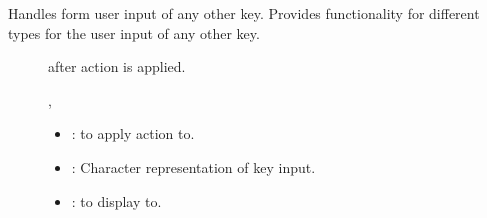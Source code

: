 \documentclass[letterpaper,10pt,english]{sphinxmanual}
\begin{document}
\begin{fulllineitems}
\begin{fulllineitems}
\label{\detokenize{index:_CPPv2N7ostendo3AddE3Vari6Window}}%
\pysigstartmultiline
{}\label{\detokenize{index:Pessumnamespaceostendo_1ac7a01c5f1ce53b6361e62f349f8f5ee4}}%
\pysigstopmultiline
Handles form user input of any other key. Provides functionality for different {\hyperref[\detokenize{index:Pessumstructostendo_1_1Var}]{}} types for the user input of any other key. \begin{description}
\item[{}] \leavevmode
{\hyperref[\detokenize{index:Pessumstructostendo_1_1Var}]{}} after action is applied. 

\item[{}] \leavevmode
{\hyperref[\detokenize{index:Pessumstructostendo_1_1Var}]{}}, {\hyperref[\detokenize{index:Pessumclassostendo_1_1Window}]{}} 

\item[{}] \leavevmode\begin{itemize}
\item {} 
: {\hyperref[\detokenize{index:Pessumstructostendo_1_1Var}]{}} to apply action to. 

\item {} 
: Character representation of key input. 

\item {} 
: {\hyperref[\detokenize{index:Pessumclassostendo_1_1Window}]{}} to display to. 

\end{itemize}

\end{description}


\end{fulllineitems}


\end{fulllineitems}
\end{document}
